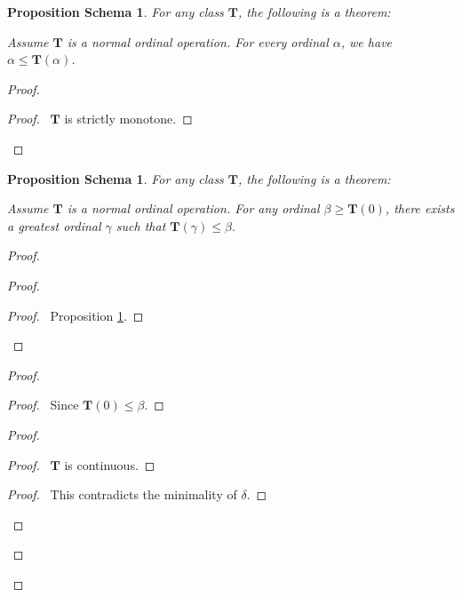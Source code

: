\documentclass{book}
\let\qed\relax
\newtheorem{props}[ax]{Proposition Schema}
\theoremstyle{definition}
\begin{document}
\begin{props}
\label{prop:gammaltTgamma}
For any class $\mathbf{T}$, the following is a theorem:

Assume $\mathbf{T}$ is a normal ordinal operation. For every ordinal $\alpha$, we have $\alpha \leq \mathbf{T}(\alpha)$.
\end{props}

\begin{proof}
\pf
{}
\begin{proof}
	\pf\ $\mathbf{T}$ is strictly monotone.
\end{proof}
\qed
\end{proof}

\begin{props}
\label{prop:greatestordinal}
For any class $\mathbf{T}$, the following is a theorem:

Assume $\mathbf{T}$ is a normal ordinal operation. For any ordinal $\beta \geq \mathbf{T}(0)$, there exists a greatest ordinal $\gamma$ such that $\mathbf{T}(\gamma) \leq \beta$.
\end{props}

\begin{proof}
\pf
{}
\begin{proof}
	\begin{proof}
		\pf\ Proposition \ref{prop:gammaltTgamma}.
	\end{proof}
\end{proof}
\begin{proof}
	\begin{proof}
		\pf\ Since $\mathbf{T}(0) \leq \beta$.
	\end{proof}
	\begin{proof}
		\begin{proof}
			\pf\ $\mathbf{T}$ is continuous.
		\end{proof}
		\qedstep
		\begin{proof}
			\pf\ This contradicts the minimality of $\delta$.
		\end{proof}
	\end{proof}
\end{proof}
\qed
\end{proof}
\end{document}
